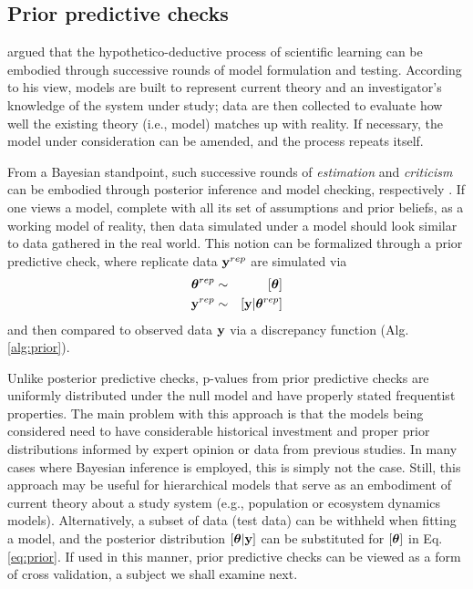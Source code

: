 \documentclass[12pt,english]{article}
\begin{document}
\begin{spacing}{1.9}
\subsection{Prior predictive checks}

\citet{Box1980} argued that the hypothetico-deductive process of scientific learning can be embodied through successive rounds of model formulation and testing. According to his view, models are built to represent current theory and an investigator's knowledge of the system under study; data are then collected to evaluate how well the existing theory (i.e., model) matches up with reality.  If necessary, the model under consideration can be amended, and the process repeats itself.

From a Bayesian standpoint, such successive rounds of \textit{estimation} and \textit{criticism} can be embodied through posterior inference and model checking, respectively \citep{Box1980}.
If one views a model, complete with all its set of assumptions and prior beliefs, as a working model of reality, then data simulated under a model should look similar to data gathered in the real world.  This notion can be formalized through a prior predictive check, where replicate data ${\bf y}^{rep}$ are simulated via
\begin{eqnarray}
   \label{eq:prior}
   \boldsymbol{\theta}^{rep} & \sim & [\boldsymbol{\theta}] \\
   {\bf y}^{rep} & \sim & [{\bf y}|\boldsymbol{\theta}^{rep}] \nonumber
\end{eqnarray}
and then compared to observed data ${\bf y}$ via a discrepancy function (Alg. \ref{alg:prior}).

Unlike posterior predictive checks, p-values from prior predictive checks are uniformly distributed under the null model and have properly stated frequentist properties.  The main problem with this approach is that the models being considered need to have considerable historical investment and proper prior distributions informed by expert opinion or data from previous studies.  In many cases where Bayesian inference is employed, this is simply not the case.  Still, this approach may be useful for hierarchical models that serve as an embodiment of current theory about a study system (e.g., population or ecosystem dynamics models).  Alternatively, a subset of data (test data) can be withheld when fitting a model, and the posterior distribution $[\boldsymbol{\theta}|{\bf y}]$ can be substituted for $[\boldsymbol{\theta}]$ in Eq. \ref{eq:prior}.  If used in this manner, prior predictive checks can be viewed as a form of cross validation, a subject we shall examine next.


\end{spacing}
\end{document}
